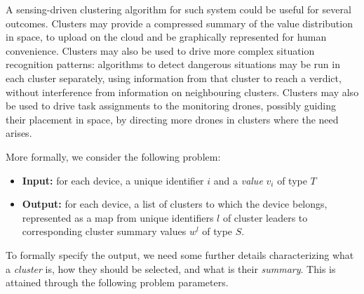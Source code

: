 A sensing-driven clustering algorithm for such system could be useful for several outcomes.
 Clusters may provide a compressed summary of the value distribution in space,
 to upload on the cloud and be graphically represented for human convenience.
%
Clusters may also be used to drive more complex situation recognition patterns:
 algorithms to detect dangerous situations may be run in each cluster separately,
 using information from that cluster to reach a verdict, 
 without interference from information on neighbouring clusters.
 Clusters may also be used to drive task assignments to the monitoring drones,
 possibly guiding their placement in space, by directing more drones in clusters where the need arises.

More formally, we consider the following problem:
\begin{itemize}
	\item \textbf{Input:} for each device, a unique identifier $i$ and a \emph{value} $v_i$ of type $T$ 
	\item \textbf{Output:} for each device, a list of clusters to which the device belongs, represented as a map from unique identifiers $l$ of cluster leaders to corresponding cluster summary values $w^l$ of type $S$.
\end{itemize}
To formally specify the output, 
 we need some further details characterizing what a \emph{cluster} is, 
 how they should be selected, and what is their \emph{summary}. 
 This is attained through the following problem parameters.
